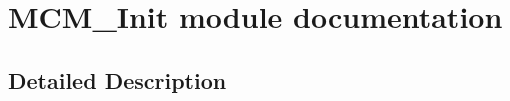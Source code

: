 \hypertarget{group___m_c_m___init__module}{}\section{M\+C\+M\+\_\+\+Init module documentation}
\label{group___m_c_m___init__module}


\subsection{Detailed Description}
